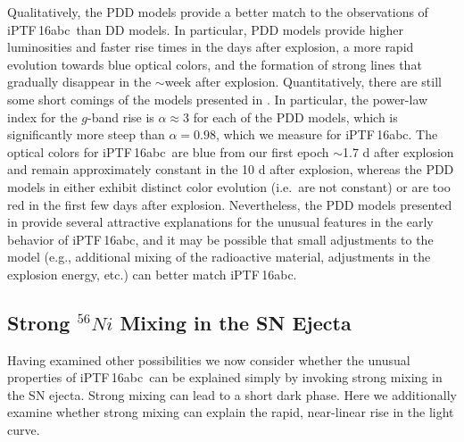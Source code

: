 \documentclass[twocolumn]{aastex61}
\newcommand{\abc}{iPTF\,16abc}
\begin{document}
Qualitatively, the PDD models provide a better match to the observations of \abc\ than DD models. In particular, PDD models provide higher luminosities and faster rise times in the days after explosion, a more rapid evolution towards blue optical colors, and the formation of strong  lines that gradually disappear in the $\sim$week after explosion. Quantitatively, there are still some short comings of the models presented in \citet{2014MNRAS.441..532D}. In particular, the power-law index for the $g$-band rise is $\alpha \approx 3$ for each of the PDD models, which is significantly more steep than $\alpha = 0.98$, which we measure for \abc. The optical colors for \abc\ are blue from our first epoch $\sim$1.7 d after explosion and remain approximately constant in the 10 d after explosion, whereas the PDD models in \citet{2014MNRAS.441..532D} either exhibit distinct color evolution (i.e.\ are not constant) or are too red in the first few days after explosion. Nevertheless, the PDD models presented in \citet{2014MNRAS.441..532D} provide several attractive explanations for the unusual features in the early behavior of \abc, and it may be possible that small adjustments to the model (e.g., additional mixing of the radioactive material, adjustments in the explosion energy, etc.) can better match \abc.

\subsection{Strong $^{56}Ni$ Mixing in the SN Ejecta}
\label{sec:Ni_mixing}

Having examined other possibilities we now consider whether the unusual properties of \abc\ can be explained simply by invoking strong mixing in the SN ejecta. Strong mixing can lead to a short dark phase. Here we additionally examine whether strong mixing can explain the rapid, near-linear rise in the light curve.
\end{document}
